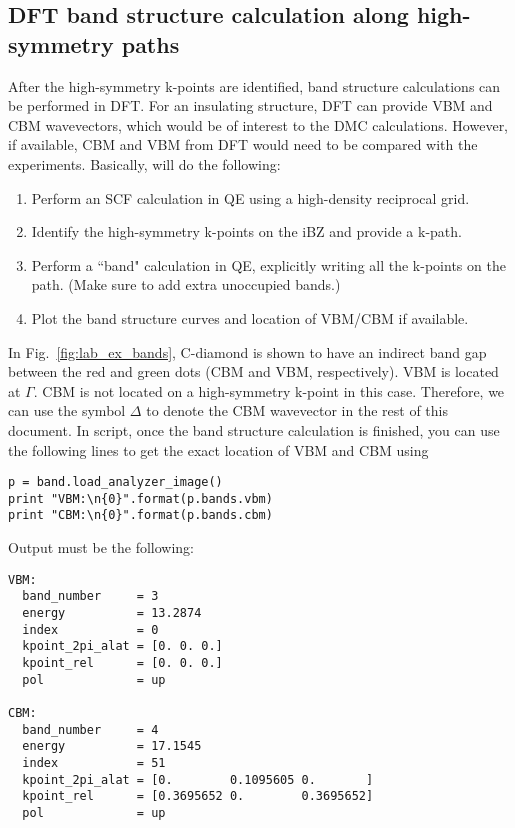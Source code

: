 \subsection{DFT band structure calculation along high-symmetry paths}
After the high-symmetry k-points are identified, band structure calculations can be performed in DFT. 
For an insulating structure, DFT can provide VBM and CBM wavevectors, which would be of interest to the DMC calculations. 
However, if available, CBM and VBM from DFT would need to be compared with the experiments.  
Basically,   will do the following:
\begin{enumerate}
	\item Perform an SCF calculation in QE using a high-density reciprocal grid.
	\item Identify the high-symmetry k-points on the iBZ and provide a k-path.
	\item Perform a ``band" calculation in QE, explicitly writing all the k-points on the path. (Make sure to add extra unoccupied bands.)
	\item Plot the band structure curves and location of VBM/CBM if available.
\end{enumerate}
In Fig.~\ref{fig:lab_ex_bands}, C-diamond is shown to have an indirect band gap between the red and green dots (CBM and VBM, respectively). 
VBM is located at $\Gamma$. CBM is not located on a high-symmetry k-point in this case. 
Therefore, we can use the symbol $\Delta$ to denote the CBM wavevector in the rest of this document. 
In  script, once the band structure calculation is finished, you can use the following lines to get the exact location of VBM and CBM using
\begin{lstlisting}[style=Python]
p = band.load_analyzer_image()
print "VBM:\n{0}".format(p.bands.vbm)
print "CBM:\n{0}".format(p.bands.cbm)
\end{lstlisting}
Output must be the following:
\begin{lstlisting}[style=Python]
VBM:
  band_number     = 3
  energy          = 13.2874
  index           = 0
  kpoint_2pi_alat = [0. 0. 0.]
  kpoint_rel      = [0. 0. 0.]
  pol             = up

CBM:
  band_number     = 4
  energy          = 17.1545
  index           = 51
  kpoint_2pi_alat = [0.        0.1095605 0.       ]
  kpoint_rel      = [0.3695652 0.        0.3695652]
  pol             = up
\end{lstlisting}
